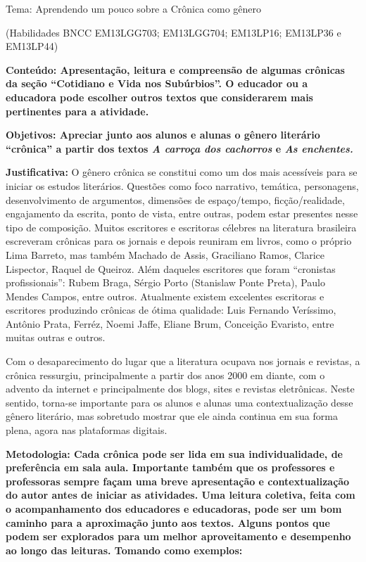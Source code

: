 Tema: Aprendendo um pouco sobre a Crônica como gênero

(Habilidades BNCC EM13LGG703; EM13LGG704; EM13LP16; EM13LP36 e
EM13LP44)



\textbf{Conteúdo: Apresentação, leitura e compreensão de algumas
crônicas da seção ``Cotidiano e Vida nos Subúrbios''. O educador ou a
educadora pode escolher outros textos que considerarem mais pertinentes
para a atividade. }

\textbf{Objetivos: Apreciar junto aos alunos e alunas o gênero literário
``crônica'' a partir dos textos \emph{A carroça dos cachorros} e
\emph{As enchentes.} }

\textbf{Justificativa:} O gênero crônica se constitui como um dos mais
acessíveis para se iniciar os estudos literários. Questões como foco
narrativo, temática, personagens, desenvolvimento de argumentos,
dimensões de espaço/tempo, ficção/realidade, engajamento da escrita,
ponto de vista, entre outras, podem estar presentes nesse tipo de
composição. Muitos escritores e escritoras célebres na literatura
brasileira escreveram crônicas para os jornais e depois reuniram em
livros, como o próprio Lima Barreto, mas também Machado de Assis,
Graciliano Ramos, Clarice Lispector, Raquel de Queiroz. Além daqueles
escritores que foram ``cronistas profissionais'': Rubem Braga, Sérgio
Porto (Stanislaw Ponte Preta), Paulo Mendes Campos, entre outros.
Atualmente existem excelentes escritoras e escritores produzindo
crônicas de ótima qualidade: Luis Fernando Veríssimo, Antônio Prata,
Ferréz, Noemi Jaffe, Eliane Brum, Conceição Evaristo, entre muitas
outras e outros.

Com o desaparecimento do lugar que a literatura ocupava nos jornais e
revistas, a crônica ressurgiu, principalmente a partir dos anos 2000 em
diante, com o advento da internet e principalmente dos blogs, sites e
revistas eletrônicas. Neste sentido, torna-se importante para os alunos
e alunas uma contextualização desse gênero literário, mas sobretudo
mostrar que ele ainda continua em sua forma plena, agora nas plataformas
digitais.

\textbf{Metodologia: Cada crônica pode ser lida em sua individualidade,
de preferência em sala aula. Importante também que os professores e
professoras sempre façam uma breve apresentação e contextualização do
autor antes de iniciar as atividades. Uma leitura coletiva, feita com o
acompanhamento dos educadores e educadoras, pode ser um bom caminho para
a aproximação junto aos textos. Alguns pontos que podem ser explorados
para um melhor aproveitamento e desempenho ao longo das leituras.
Tomando como exemplos:}

